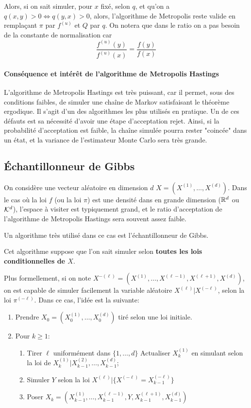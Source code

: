 Alors, si on sait simuler, pour $x$ fixé, selon $q$, et qu'on a $q(x, y) > 0 \Leftrightarrow q(y, x) > 0$, alors, l'algorithme de Metropolis reste valide en remplaçant $\pi$ par $f^{(u)}$ et $Q$ par $q$. On notera que dans le ratio on a pas besoin de la constante de normalisation car 
$$\frac{f^{(u)}(y)}{f^{(u)}(x)} = \frac{f(y)}{f(x)}$$

\paragraph{Conséquence et intérêt de l'algorithme de Metropolis Hastings} L'algorithme de Metropolis Hastings est très puissant, car il permet, sous des conditions faibles, de simuler une chaîne de Markov satisfaisant le théorème ergodique. Il s'agit d'un des algorithmes les plus utilisés en pratique. Un de ces défauts est sa nécessité d'avoir une étape d'acceptation rejet. Ainsi, si la probabilité d'acceptation est faible, la chaîne simulée pourra rester "coincée" dans un état, et la variance de l'estimateur Monte Carlo sera très grande.

\subsection{Échantillonneur de Gibbs}

On considère une vecteur aléatoire en dimension $d$ $X = (X^{(1)},\dots, X^{(d)})$.
Dans le cas où la loi $f$ (ou la loi $\pi$) est une densité dans en grande dimension ($\mathbb{R}^d$ ou $\mathcal{K}^d$), l'espace à visiter est typiquement grand, et le ratio d'acceptation de l'algorithme de Metropolis Hastings sera souvent assez faible.

Un algorithme très utilisé dans ce cas est l'échantillonneur de Gibbs.

Cet algorithme suppose que l'on sait simuler  selon \textbf{toutes les lois conditionnelles de $X$}. 

Plus formellement, si on note $X^{-(\ell)} =  (X^{(1)},\dots, X^{(\ell-1)}, X^{(\ell+1)}, X^{(d)})$, on est capable de simuler facilement la variable aléatoire $X^{(\ell)}\vert X^{(-\ell)}$, selon la loi $\pi^{(-\ell)}$. 
Dans ce cas, l'idée est la suivante: 
\begin{enumerate}
\item Prendre $X_0 = (X_0^{(1)},\dots, X_0^{(d)})$ tiré selon une loi initiale.
\item Pour $k \geq 1$:
\begin{enumerate}
\item Tirer $\ell$ uniformément dans $\lbrace1,\dots,d\rbrace$
Actualiser $X_k^{(1)}$ en simulant selon la loi de $X_k^{(1)}\vert X_{k - 1}^{(2)},\dots , X_{k - 1}^{(d)}$;
\item Simuler $Y$ selon la loi $X^{(\ell)} \vert \lbrace X^{(-\ell)} = X_{k-1}^{(-\ell)} \rbrace$
\item Poser $X_k = (X_{k - 1}^{(1)},\dots, X_{k-1}^{(\ell-1)}, Y, X_{k - 1}^{(\ell+1)}, X_{k-1}^{(d)})$
\end{enumerate} 
\end{enumerate}

